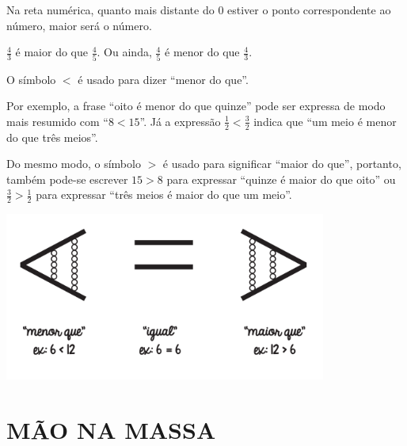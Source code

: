 Na reta numérica, quanto mais distante do 0 estiver o ponto correspondente ao número, maior será o número. 
\begin{center}
\end{center}

$\frac{4}{3}$ é maior do que $\frac{4}{5}$. Ou ainda, $\frac{4}{5}$ é menor do que $\frac{4}{3}$.


O símbolo $<$ é usado para dizer ``menor do que''.

Por exemplo, a frase ``oito é menor do que quinze'' pode ser expressa de modo mais resumido com ``$8<15$''. Já a expressão $\frac{1}{2}<\frac{3}{2}$ indica que ``um meio é menor do que três meios''.

Do mesmo modo, o símbolo $>$ é usado para significar ``maior do que'', portanto, também pode-se escrever $15>8$ para expressar ``quinze é maior do que oito'' ou $\frac{3}{2}>\frac{1}{2}$  para expressar ``três meios é maior do que um meio''.
\begin{center}
  \includegraphics[width=300pt, keepaspectratio]{..//media//cap3/secoes/png/orgideias_fig05.png}   
\end{center}
  
\section{MÃO NA MASSA }

